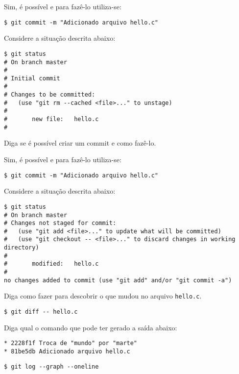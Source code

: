 \begin{Answer}[ref={0010}]
  Sim, é possível e para fazê-lo utiliza-se:
  \begin{lstlisting}
$ git commit -m "Adicionado arquivo hello.c"
  \end{lstlisting}
\end{Answer}
\begin{Exercise}[label={0011}, difficulty={1}, origin={git}]
  Considere a situação descrita abaixo:
  \begin{lstlisting}
$ git status
# On branch master
#
# Initial commit
#
# Changes to be committed:
#   (use "git rm --cached <file>..." to unstage)
#
#       new file:   hello.c
#
  \end{lstlisting}
  Diga se é possível criar um commit e como fazê-lo.
\end{Exercise}
\begin{Answer}[ref={0011}]
  Sim, é possível e para fazê-lo utiliza-se:
  \begin{lstlisting}
$ git commit -m "Adicionado arquivo hello.c"
  \end{lstlisting}
\end{Answer}
\begin{Exercise}[label={0012}, difficulty={1}, origin={git}]
  Considere a situação descrita abaixo:
  \begin{lstlisting}
$ git status
# On branch master
# Changes not staged for commit:
#   (use "git add <file>..." to update what will be committed)
#   (use "git checkout -- <file>..." to discard changes in working directory)
#
#       modified:   hello.c
#
no changes added to commit (use "git add" and/or "git commit -a")
  \end{lstlisting}
  Diga como fazer para descobrir o que mudou no arquivo \lstinline+hello.c+.
\end{Exercise}
\begin{Answer}[ref={0012}]
  \begin{lstlisting}
$ git diff -- hello.c
  \end{lstlisting}
\end{Answer}
\begin{Exercise}[label={0013}, difficulty={1}, origin={git}]
  Diga qual o comando que pode ter gerado a saída abaixo:
  \begin{lstlisting}
* 2228f1f Troca de "mundo" por "marte"
* 81be5db Adicionado arquivo hello.c
  \end{lstlisting}
\end{Exercise}
\begin{Answer}[ref={0013}]
  \begin{lstlisting}
$ git log --graph --oneline
  \end{lstlisting}
\end{Answer}

